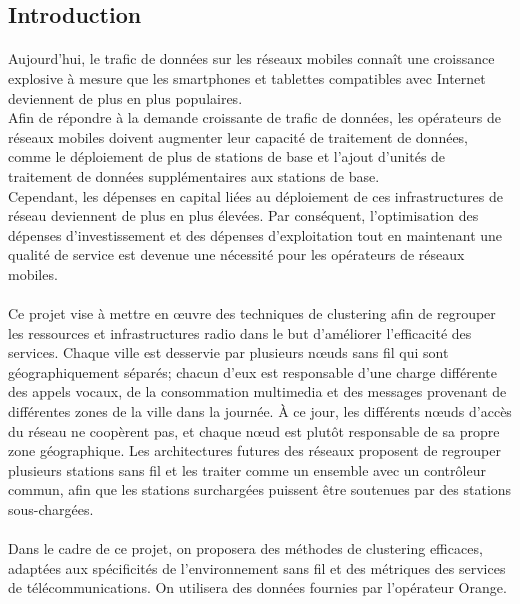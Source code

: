 \documentclass{article}
\begin{document}
  \begin{center}
\section*{\LARGE{Introduction}}
  \end{center}
\Large{\paragraph{}
        Aujourd'hui, le trafic de données sur les réseaux mobiles connaît une croissance explosive à mesure que les smartphones et tablettes compatibles avec Internet deviennent de plus en plus populaires.\\
Afin de répondre à la demande croissante de trafic de données, les opérateurs de réseaux mobiles doivent augmenter leur capacité de traitement de données, comme le déploiement de plus de stations de base et l'ajout d'unités de traitement de données supplémentaires aux stations de base. \\
Cependant, les dépenses en capital liées au déploiement de ces infrastructures de réseau deviennent de plus en plus élevées. Par conséquent, l'optimisation des dépenses d'investissement et des dépenses d'exploitation tout en maintenant une qualité de service est devenue une nécessité pour les opérateurs de réseaux mobiles.
\paragraph{}
Ce projet vise à mettre en œuvre des techniques de clustering afin de regrouper les ressources et infrastructures radio dans le but d'améliorer l'efficacité des services. 
Chaque ville est desservie par plusieurs nœuds sans fil qui sont géographiquement séparés; chacun d'eux est responsable d'une charge différente des appels vocaux, de la consommation multimedia et des messages provenant de différentes zones de la ville dans la journée. 
À ce jour, les différents nœuds d'accès du réseau ne coopèrent pas, et chaque nœud est plutôt responsable de sa propre zone géographique. Les architectures futures des réseaux proposent de regrouper plusieurs stations sans fil et les traiter comme un ensemble avec un contrôleur commun, afin que les stations surchargées puissent être soutenues par des stations sous-chargées. 
\paragraph{}
Dans le cadre de ce projet, on proposera des méthodes de clustering efficaces, adaptées aux spécificités de l'environnement sans fil et des métriques des services de télécommunications. On utilisera des données fournies par l’opérateur Orange.
}
\newpage
\end{document}
